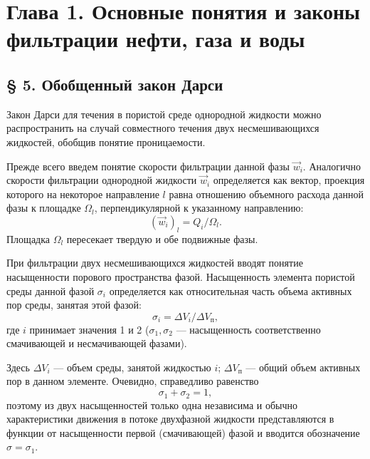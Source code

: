 \section*{Глава 1. Основные понятия и законы фильтрации нефти, газа и воды}
\subsection*{§ 5. Обобщенный закон Дарси}
Закон Дарси для течения в пористой среде однородной жидкости можно распространить на случай совместного течения двух несмешивающихся жидкостей, обобщив понятие проницаемости.

Прежде всего введем понятие скорости фильтрации данной фазы $\vec w_i$. Аналогично скорости фильтрации однородной жидкости $\vec w_i$ определяется как вектор, проекция которого на некоторое направление $l$ равна отношению объемного расхода данной фазы к площадке $\Omega_l$, перпендикулярной к указанному направлению:
\begin{equation}(\vec w_i)_l=Q_i/\Omega_l.\tag{1.15}\label{q10:eq-1-15}\end{equation}
Площадка $\Omega_l$ пересекает твердую и обе подвижные фазы.

При фильтрации двух несмешивающихся жидкостей вводят понятие насыщенности порового пространства фазой. Насыщенность элемента пористой среды данной фазой $\sigma_i$ определяется как относительная часть объема активных пор среды, занятая этой фазой:
\begin{equation}\sigma_i=\Delta V_i/\Delta V_\text{п},\tag{1.16}\label{q10:eq-1-16}\end{equation}
где $i$ принимает значения 1 и 2 ($\sigma_1,\sigma_2$ --- насыщенность соответственно смачивающей и несмачивающей фазами).

Здесь $\Delta V_i$ --- объем среды, занятой жидкостью $i$; $\Delta V_\text{п}$ --- общий объем активных пор в данном элементе. Очевидно, справедливо равенство
\begin{equation}\sigma_1+\sigma_2=1,\tag{1.17}\label{q10:eq-1-17}\end{equation}
поэтому из двух насыщенностей только одна независима и обычно характеристики движения в потоке двухфазной жидкости представляются в функции от насыщенности первой (смачивающей) фазой и вводится обозначение $\sigma=\sigma_1$.

